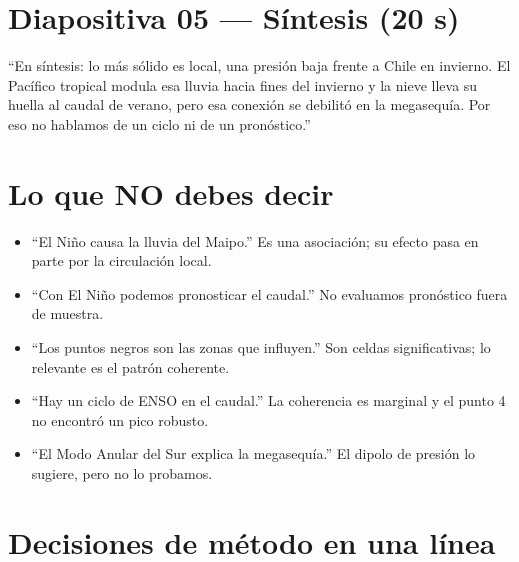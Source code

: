 \documentclass[11pt,letterpaper]{article}
\begin{document}
\section{Diapositiva 05 --- Síntesis (20 s)}

\begin{guion}
``En síntesis: lo más sólido es local, una presión baja frente a Chile en invierno. El Pacífico tropical modula esa
lluvia hacia fines del invierno y la nieve lleva su huella al caudal de verano, pero esa conexión se debilitó en
la megasequía. Por eso no hablamos de un ciclo ni de un pronóstico.''
\end{guion}

\section{Lo que NO debes decir}

\begin{itemize}
\item ``El Niño causa la lluvia del Maipo.'' Es una asociación; su efecto pasa en parte por la circulación local.
\item ``Con El Niño podemos pronosticar el caudal.'' No evaluamos pronóstico fuera de muestra.
\item ``Los puntos negros son las zonas que influyen.'' Son celdas significativas; lo relevante es el patrón coherente.
\item ``Hay un ciclo de ENSO en el caudal.'' La coherencia es marginal y el punto 4 no encontró un pico robusto.
\item ``El Modo Anular del Sur explica la megasequía.'' El dipolo de presión lo sugiere, pero no lo probamos.
\end{itemize}

\section{Decisiones de método en una línea}
\end{document}
